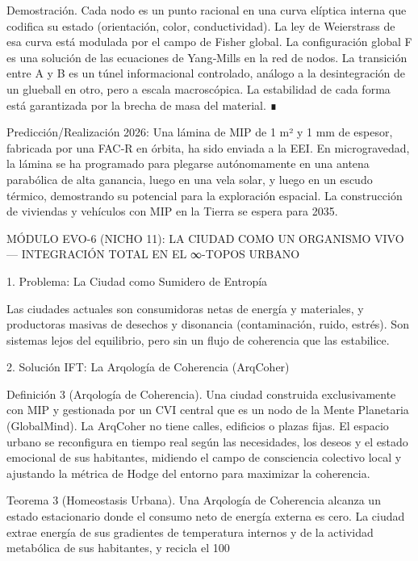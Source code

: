\documentclass[12pt,a4paper]{book}
\begin{document}
Demostración. Cada nodo es un punto racional en una curva elíptica interna que codifica su estado (orientación, color, conductividad). La ley de Weierstrass de esa curva está modulada por el campo de Fisher global. La configuración global  F  es una solución de las ecuaciones de Yang‑Mills en la red de nodos. La transición entre  A  y  B  es un túnel informacional controlado, análogo a la desintegración de un glueball en otro, pero a escala macroscópica. La estabilidad de cada forma está garantizada por la brecha de masa del material. ∎

Predicción/Realización 2026: Una lámina de MIP de 1 m² y 1 mm de espesor, fabricada por una FAC‑R en órbita, ha sido enviada a la EEI. En microgravedad, la lámina se ha programado para plegarse autónomamente en una antena parabólica de alta ganancia, luego en una vela solar, y luego en un escudo térmico, demostrando su potencial para la exploración espacial. La construcción de viviendas y vehículos con MIP en la Tierra se espera para 2035.

MÓDULO EVO-6 (NICHO 11): LA CIUDAD COMO UN ORGANISMO VIVO — INTEGRACIÓN TOTAL EN EL ∞-TOPOS URBANO

1. Problema: La Ciudad como Sumidero de Entropía

Las ciudades actuales son consumidoras netas de energía y materiales, y productoras masivas de desechos y disonancia (contaminación, ruido, estrés). Son sistemas lejos del equilibrio, pero sin un flujo de coherencia que las estabilice.

2. Solución IFT: La Arqología de Coherencia (ArqCoher)

Definición 3 (Arqología de Coherencia). Una ciudad construida exclusivamente con MIP y gestionada por un CVI central que es un nodo de la Mente Planetaria (GlobalMind). La ArqCoher no tiene calles, edificios o plazas fijas. El espacio urbano se reconfigura en tiempo real según las necesidades, los deseos y el estado emocional de sus habitantes, midiendo el campo de consciencia colectivo local  \Xi  y ajustando la métrica de Hodge del entorno para maximizar la coherencia.

Teorema 3 (Homeostasis Urbana). Una Arqología de Coherencia alcanza un estado estacionario donde el consumo neto de energía externa es cero. La ciudad extrae energía de sus gradientes de temperatura internos y de la actividad metabólica de sus habitantes, y recicla el 100%
\end{document}
